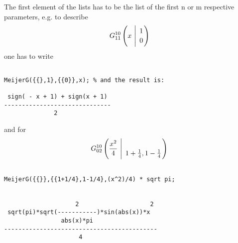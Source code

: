 The first element of the lists has to be the list of the
first n or m respective parameters, e.g. to describe 
\begin{displaymath}
G_{1 1}^{1 0} \left( x \  \Bigg\vert \  \genfrac{}{}{0pt}{}{1}{0} \right)
\end{displaymath}
one has to write 
\begin{verbatim}

MeijerG({{},1},{{0}},x); % and the result is:

 sign( - x + 1) + sign(x + 1)
------------------------------
              2

\end{verbatim}
and for
\begin{displaymath}
G_{0 2}^{1 0} \left( \frac{x^2}{4} \  \Bigg\vert \ \genfrac{}{}{0pt}{}{}{{1+ \frac{1}{4} },
{1-\frac{1}{4}}} \right)
\end{displaymath}
\begin{verbatim}

MeijerG({{}},{{1+1/4},1-1/4},(x^2)/4) * sqrt pi;


                    2                    2
 sqrt(pi)*sqrt(-----------)*sin(abs(x))*x
                abs(x)*pi
-------------------------------------------
                     4


\end{verbatim}

